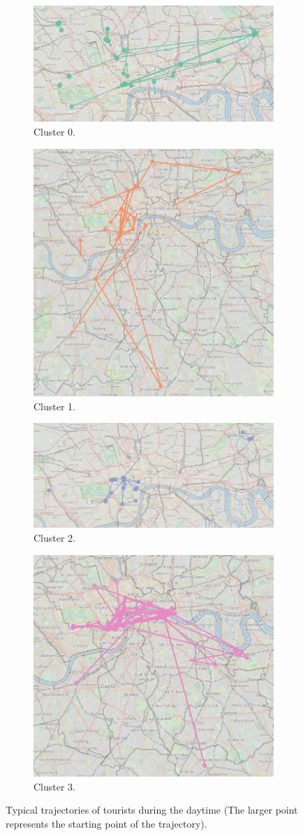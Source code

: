\documentclass{article}
\theoremstyle{definition}
\theoremstyle{remark}
\begin{document}
\begin{figure}[!h]

\centering
\begin{subfigure}{0.6\textheight}
\centering
\includegraphics[width=0.4\linewidth]{figures/daytime_tourists_c0.png}
\caption{Cluster 0.}
\label{fig:daytime_tourists_c0}
\end{subfigure}
\begin{subfigure}{0.6\textheight}
\centering
\includegraphics[width=0.4\linewidth]{figures/daytime_tourists_c1.png}
\caption{Cluster 1.}
\label{fig:daytime_tourists_c1}
\end{subfigure}
\begin{subfigure}{0.6\textheight}
\centering
\includegraphics[width=0.4\linewidth]{figures/daytime_tourists_c2.png}
\caption{Cluster 2.}
\label{fig:daytime_tourists_c2}
\end{subfigure}
\begin{subfigure}{0.6\textheight}
\centering
\includegraphics[width=0.4\linewidth]{figures/daytime_tourists_c3.png}
\caption{Cluster 3.}
\label{fig:daytime_tourists_c3}
\end{subfigure}

\caption{Typical trajectories of tourists during the daytime (The larger point represents the starting point of the trajectory).}
\label{fig:sequences_daytime_tourists}
\end{figure}
\end{document}
